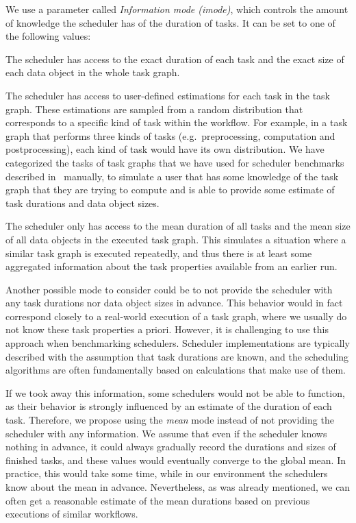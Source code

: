 \begin{description}[wide=0pt]
		We use a parameter called \emph{Information mode (imode)}, which controls the amount of knowledge the
		scheduler has of the duration of tasks. It can be set to one of the following values:
		\begin{description}[wide=20pt,leftmargin=20pt]
			\item[exact] The scheduler has access to the exact duration of each task and the exact size of each data object
				in the whole task graph.
			\item[user] The scheduler has access to user-defined estimations for each task in the task graph. These
				estimations are sampled from a random distribution that corresponds to a specific kind of task
				within the workflow. For example, in a task graph that performs three kinds of tasks (e.g.\
				preprocessing, computation and postprocessing), each kind of task would have its own distribution.
				We have categorized the tasks of task graphs that we have used for scheduler benchmarks described
				in~\Autoref{sec:estee-benchmarks} manually, to simulate a user that has some knowledge of the task graph
				that they are trying to compute and is able to provide some estimate of task durations and data
				object sizes.
			\item[mean] The scheduler only has access to the mean duration of all tasks and the mean size of all data
				objects in the executed task graph. This simulates a situation where a similar task graph is
				executed repeatedly, and thus there is at least some aggregated information about the task
				properties available from an earlier run.
		\end{description}
		Another possible mode to consider could be to not provide the scheduler with any task durations nor
		data object sizes in advance. This behavior would in fact correspond closely to a real-world
		execution of a task graph, where we usually do not know these task properties a priori. However, it
		is challenging to use this approach when benchmarking schedulers. Scheduler implementations are
		typically described with the assumption that task durations are known, and the scheduling
		algorithms are often fundamentally based on calculations that make use of them.

		If we took away this information, some schedulers would not be able to function, as their behavior
		is strongly influenced by an estimate of the duration of each task. Therefore, we propose using the
		\emph{mean} mode instead of not providing the scheduler with any information. We assume
		that even if the scheduler knows nothing in advance, it could always gradually record the durations
		and sizes of finished tasks, and these values would eventually converge to the global mean. In
		practice, this would take some time, while in our environment the schedulers know about the mean in
		advance. Nevertheless, as was already mentioned, we can often get a reasonable estimate of the mean
		durations based on previous executions of similar workflows.
\end{description}

